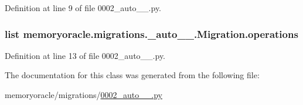 Definition at line 9 of file 0002\+\_\+auto\+\_\+\_.\+py.

\hypertarget{classmemoryoracle_1_1migrations_1_10002__auto__20150402__2000_1_1Migration_a6025e0caf46b0c277851adc0396a042a}{}
\subsubsection[{operations}]{\setlength{\rightskip}{0pt plus 5cm}list memoryoracle.\+migrations.\+\_\+auto\+\_\+\_.\+Migration.\+operations\hspace{0.3cm}{\ttfamily [static]}}\label{classmemoryoracle_1_1migrations_1_10002__auto__20150402__2000_1_1Migration_a6025e0caf46b0c277851adc0396a042a}


Definition at line 13 of file 0002\+\_\+auto\+\_\+\_.\+py.



The documentation for this class was generated from the following file\+:\begin{DoxyCompactItemize}
\item 
memoryoracle/migrations/\hyperlink{0002__auto__20150402__2000_8py}{0002\+\_\+auto\+\_\+\_.\+py}\end{DoxyCompactItemize}
